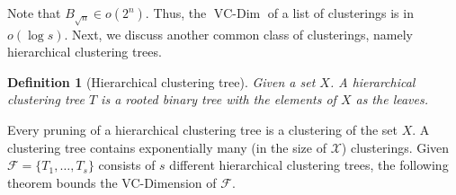 \documentclass[12pt]{article}
\newtheorem{definition}[theorem]{Definition}
\newcommand{\mc}{\mathcal}
\DeclareMathOperator*{\vcdim}{VC-Dim}
\begin{document}
\noindent Note that $B_{\sqrt n} \in o(2^{n})$. Thus, the $\vcdim$ of a list of clusterings is in $o( \log s)$. Next, we discuss another common class of clusterings, namely hierarchical clustering trees. 

\begin{definition}[Hierarchical clustering tree]
Given a set $X$. A hierarchical clustering tree $T$ is a rooted binary tree with the elements of $X$ as the leaves. 
\end{definition}

\noindent Every pruning of a hierarchical clustering tree is a clustering of the set $X$. A clustering tree contains exponentially many (in the size of $\mc X$) clusterings. Given $\mc F = \{T_1, \ldots, T_s\}$ consists of $s$ different hierarchical clustering trees, the following theorem bounds the VC-Dimension of ${\mc F}$.
\end{document}
